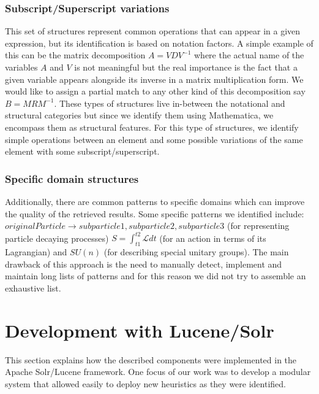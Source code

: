 \subsubsection{Subscript/Superscript variations}
This set of structures represent common operations that can appear in a given expression, but its identification is based on notation factors. A simple example of this can be the matrix decomposition $A = VDV^{-1}$ where the actual name of the variables $A$ and $V$ is not meaningful but the real importance is the fact that a given variable appears alongside its inverse in a matrix multiplication form. We would like to assign a partial match to any other kind of this decomposition say $B = MRM^{-1}$. These types of structures live in-between the notational and structural categories but since we identify them using Mathematica, we encompass them as structural features. For this type of structures, we identify simple operations between an element and some possible variations of the same element with some subscript/superscript.

\subsubsection{Specific domain structures}

Additionally, there are common patterns to specific domains which can improve the quality of the retrieved results. Some specific patterns we identified include: $originalParticle \rightarrow subparticle1, subparticle2, subparticle3$ (for representing particle decaying processes) $S = \int^{t2}_{t1} \mathcal{L} dt$ (for an action in terms of its Lagrangian) and $SU(n)$ (for describing special unitary groups). The main drawback of this approach is the need to manually detect, implement and maintain long lists of patterns and for this reason we did not try to assemble an exhaustive list.


\section{Development with Lucene/Solr}
This section explains how the described components were implemented in the {\codefont Apache Solr/Lucene} framework.
One focus of our work was to develop a modular system that allowed easily to deploy new heuristics as they were identified. 

